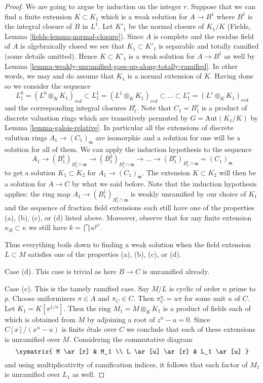 \begin{proof}
\medskip\noindent
We are going to argue by induction on the integer $r$. Suppose that we
can find a finite extension $K \subset K_1$ which is a weak solution
for $A \to B^1$ where $B^1$ is the integral closure of $B$ in $L^1$.
Let $K'_1$ be the normal closure of $K_1/K$
(Fields, Lemma \ref{fields-lemma-normal-closure}).
Since $A$ is complete and the residue field of $A$ is algebraically closed
we see that $K_1 \subset K'_1$ is separable and totally ramified
(some details omitted).
Hence $K \subset K'_1$ is a weak solution for $A \to B^1$ as well by
Lemma \ref{lemma-weakly-unramified-goes-up-along-totally-ramified}.
In other words, we may and do assume that $K_1$ is a normal extension of $K$.
Having done so we consider the sequence
$$
L^0_1 = (L^0 \otimes_K K_1)_{red} \subset
L^1_1 = (L^1 \otimes_K K_1)_{red} \subset \ldots \subset
L^r_1 = (L^r \otimes_K K_1)_{red}
$$
and the corresponding integral closures $B^i_1$. Note that $C_1 = B^r_1$
is a product of discrete valuation rings which are transitively permuted
by $G = \text{Aut}(K_1/K)$ by Lemma \ref{lemma-galois-relative}.
In particular all the extensions of discrete valution rings
$A_1 \to (C_1)_\mathfrak m$ are isomorphic and a solution for one
will be a solution for all of them. We can apply the induction
hypothesis to the sequence
$$
A_1 \to (B^1_1)_{B^1_1 \cap \mathfrak m} \to
(B^2_1)_{B^2_1 \cap \mathfrak m} \to
\ldots \to
(B^r_1)_{B^r_1 \cap \mathfrak m} =
(C_1)_\mathfrak m
$$
to get a solution $K_1 \subset K_2$ for $A_1 \to (C_1)_\mathfrak m$.
The extension $K \subset K_2$ will then be a solution for $A \to C$
by what we said before. Note that the induction hypothesis applies:
the ring map $A_1 \to (B^1_1)_{B^1_1 \cap \mathfrak m}$
is weakly unramified by our choice of $K_1$
and the sequence of fraction field extensions
each still have one of the properties (a), (b), (c), or (d)
listed above. Moreover, observe that for any finite extension 
$\kappa_B \subset \kappa$ we still have $k = \bigcap \kappa^{p^n}$.

\medskip\noindent
Thus everything boils down to finding a weak solution when the field
extension $L \subset M$ satisfies one of the properties (a), (b), (c), or (d).

\medskip\noindent
Case (d). This case is trivial as here $B \to C$ is unramified already.

\medskip\noindent
Case (c). This is the tamely ramified case. Say $M/L$ is cyclic of
order $n$ prime to $p$. Choose uniformizers $\pi \in A$ and $\pi_C \in C$.
Then $\pi_C^n = u\pi$ for some unit $u$ of $C$. Let $K_1 = K[\pi^{1/n}]$.
Then the ring $M_1 = M \otimes_K K_1$ is a product of fields each of which
is obtained from $M$ by adjoining a root of $z^n - u = 0$.
Since $C[x]/(x^n - u)$ is finite \'etale over $C$ we conclude that
each of these extensions is unramified over $M$.
Considering the commutative diagram
$$
\xymatrix{
M \ar[r] & M_1 \\
L \ar[u] \ar[r] & L_1 \ar[u]
}
$$
and using multiplicativity of ramification indices, it follows that each
factor of $M_1$ is unramified over $L_1$ as well.


\end{proof}
